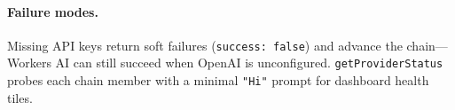 \paragraph{Failure modes.} Missing API keys return soft failures (\texttt{success: false}) and advance the chain---Workers AI can still succeed when OpenAI is unconfigured. \texttt{getProviderStatus} probes each chain member with a minimal \texttt{"Hi"} prompt for dashboard health tiles.

